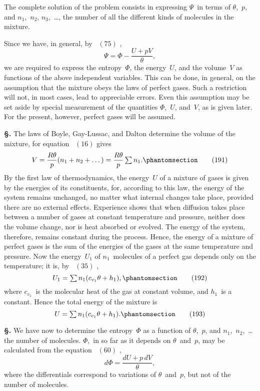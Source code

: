\documentclass[12pt]{book}[2005/09/16]
\newcommand{\Typo}[2]{#2}
\newcommand{\Section}[1]{
  \medskip\par\textbf{§\;#1}
  \label{section:#1}
}
\newcommand{\Tag}[1]{%
  \phantomsection\label{eqn:#1}\tag*{\ensuremath{#1}}%
}
\newcommand{\Eq}[1]{%
  \hyperref[eqn:#1]{\ensuremath{#1}}%
}
\newcommand{\PageSep}[1]{\ignorespaces}
\newcommand{\tsum}{\mathop{\textstyle\sum}\limits}
\begin{document}
The complete solution of the problem consists in expressing
$\Psi$~in terms of $\theta$,~$p$, and $n_{1}$,~$n_{2}$, $n_{3}$,~\dots, the number of
all the different kinds of molecules in the mixture.

Since we have, in general, by~\Eq{(75)},
\[
\Psi = \Phi - \frac{U + pV}{\theta},
\]
we are required to express the entropy~$\Phi$, the energy~$U$, and
the volume~$V$ as functions of the above independent variables.
This can be done, in general, on the assumption that the
mixture obeys the laws of perfect gases. Such a restriction
will not, in most cases, lead to appreciable errors. Even this
assumption may be set aside by special measurement of the
\PageSep{208}
quantities $\Phi$,~$U$, and~$V$, as is given later. For the present,
however, perfect gases will be assumed.

\Section{233.} The laws of Boyle, \Typo{Gay Lussac}{Gay-Lussac}, and Dalton determine
the volume of the mixture, for equation~\Eq{(16)} gives
\[
V = \frac{R\theta}{p} (n_{1} + n_{2} + \dots) = \frac{R\theta}{p} \tsum n_{1}.
\Tag{(191)}
\]
By the first law of thermodynamics, the energy~$U$ of a
mixture of gases is given by the energies of its constituents,
for, according to this law, the energy of the system remains
unchanged, no matter what internal changes take place,
provided there are no external effects. Experience shows
that when diffusion takes place between a number of gases
at constant temperature and pressure, neither does the
volume change, nor is heat absorbed or evolved. The energy
of the system, therefore, remains constant during the process.
Hence, the energy of a mixture of perfect gases is the sum
of the energies of the gases at the same temperature and
pressure. Now the energy~$U_{1}$ of $n_{1}$~molecules of a perfect
gas depends only on the temperature; it is, by~\Eq{(35)},
\[
U_{1} = \tsum n_{1} (c_{v_{1}}\theta + h_{1}),
\Tag{(192)}
\]
where $c_{v_{1}}$~is the molecular heat of the gas at constant volume,
and $h_{1}$~is a constant. Hence the total energy of the mixture
is
\[
U = \tsum n_{1} (c_{v_{1}}\theta + h_{1}).
\Tag{(193)}
\]

\Section{234.} We have now to determine the entropy~$\Phi$ as a
function of $\theta$,~$p$, and $n_{1}$,~$n_{2}$,~\dots the number of molecules.
$\Phi$,~in so far as it depends on $\theta$~and~$p$, may be calculated from
the equation~\Eq{(60)},
\[
d\Phi = \frac{dU + p\, dV}{\theta},
\]
\PageSep{209}
where the differentials correspond to variations of $\theta$~and~$p$,
but not of the number of molecules.
\end{document}
